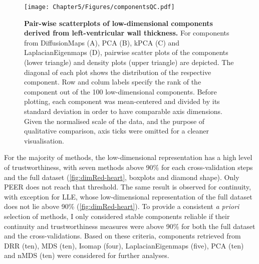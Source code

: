 \begin{figure}[h!]
	\centering
	\texttt{[image: Chapter5/Figures/componentsQC.pdf]}
	\caption[\textbf{Pair-wise scatterplots of low-dimensional components derived from left-ventricular wall thickness. }]{\textbf{Pair-wise scatterplots of low-dimensional components derived from left-ventricular wall thickness. }For components from DiffusionMaps (A), PCA (B), kPCA (C) and LaplacianEigenmaps (D),  pairwise scatter plots of the components (lower triangle) and density plots (upper triangle) are depicted. The diagonal of each plot shows the distribution of the respective component. Row and colum labels specify the rank of the component out of the \num{100} low-dimensional components. Before plotting, each component was mean-centered and divided by its standard deviation in order to have comparable axis dimensions. Given the normalised scale of the data, and the purpose of qualitative comparison, axis ticks were omitted for a cleaner visualisation. }
	 	\label{fig:distribution-DimRed}
\end{figure}
%
For the majority of methods, the low-dimensional representation has a high level of trustworthiness, with seven methods above \num{90}\% for each cross-validation steps and the full dataset (\cref{fig:dimRed-heart}, boxplots and diamond shape). Only PEER does not reach that threshold. The same result is observed for continuity, with exception for LLE, whose low-dimensional representation of the full dataset does not lie above \num{90}\% (\cref{fig:dimRed-heart}).  To provide a consistent \textit{a priori} selection of methods, I only considered stable components reliable if their continuity and trustworthiness measures were above \num{90}\% for both the full dataset and the cross-validations. Based on these criteria, components retrieved from DRR (ten), MDS (ten), Isomap (four), LaplacianEigenmaps (five), PCA (ten) and nMDS (ten) were considered for further analyses.

